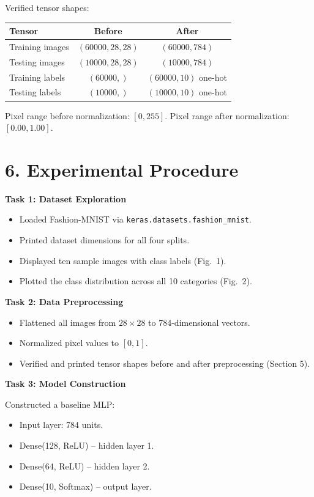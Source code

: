 \documentclass[11pt]{article}
\begin{document}
Verified tensor shapes:

\begin{center}
\begin{tabular}{|l|c|c|}
\hline
\textbf{Tensor} & \textbf{Before} & \textbf{After}\\
\hline
Training images & $(60000, 28, 28)$ & $(60000, 784)$\\
Testing images & $(10000, 28, 28)$ & $(10000, 784)$\\
Training labels & $(60000,)$ & $(60000, 10)$ one-hot\\
Testing labels & $(10000,)$ & $(10000, 10)$ one-hot\\
\hline
\end{tabular}
\end{center}

Pixel range before normalization: $[0, 255]$. Pixel range after normalization: $[0.00, 1.00]$.


\section*{6. Experimental Procedure}

\textbf{Task 1: Dataset Exploration}
\begin{itemize}
\item Loaded Fashion-MNIST via \texttt{keras.datasets.fashion\_mnist}.
\item Printed dataset dimensions for all four splits.
\item Displayed ten sample images with class labels (Fig.~1).
\item Plotted the class distribution across all 10 categories (Fig.~2).
\end{itemize}

\textbf{Task 2: Data Preprocessing}
\begin{itemize}
\item Flattened all images from $28\times28$ to 784-dimensional vectors.
\item Normalized pixel values to $[0,1]$.
\item Verified and printed tensor shapes before and after preprocessing (Section 5).
\end{itemize}

\textbf{Task 3: Model Construction}

Constructed a baseline MLP:
\begin{itemize}
\item Input layer: 784 units.
\item Dense(128, ReLU) -- hidden layer 1.
\item Dense(64, ReLU) -- hidden layer 2.
\item Dense(10, Softmax) -- output layer.
\end{itemize}
\end{document}
